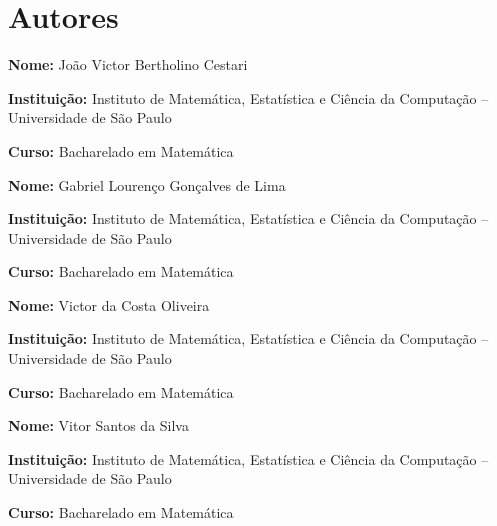 \chapter*{Autores}
\thispagestyle{empty}

\vspace{1cm}

\begin{flushleft}
  \textbf{Nome:} João Victor Bertholino Cestari \par
  \textbf{Instituição:} Instituto de Matemática, Estatística e Ciência da Computação -- Universidade de São Paulo \par
  \textbf{Curso:} Bacharelado em Matemática \par
\end{flushleft}

\vspace{0.5cm}

\begin{flushleft}
  \textbf{Nome:} Gabriel Lourenço Gonçalves de Lima \par
  \textbf{Instituição:} Instituto de Matemática, Estatística e Ciência da Computação -- Universidade de São Paulo \par
  \textbf{Curso:} Bacharelado em Matemática \par
\end{flushleft}

\vspace{0.5cm}

\begin{flushleft}
  \textbf{Nome:} Victor da Costa Oliveira \par
  \textbf{Instituição:} Instituto de Matemática, Estatística e Ciência da Computação -- Universidade de São Paulo \par
  \textbf{Curso:} Bacharelado em Matemática \par
\end{flushleft}

\vspace{0.5cm}

\begin{flushleft}
  \textbf{Nome:} Vitor Santos da Silva \par
  \textbf{Instituição:} Instituto de Matemática, Estatística e Ciência da Computação -- Universidade de São Paulo \par
  \textbf{Curso:} Bacharelado em Matemática \par
\end{flushleft}

